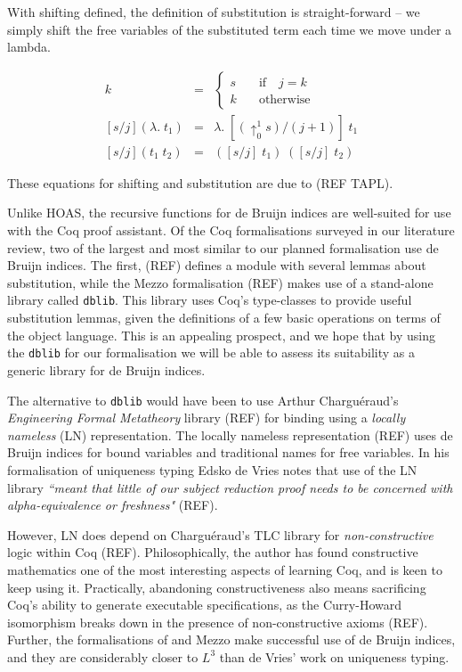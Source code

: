 \documentclass[]{unswthesis}
\newcommand{\SSPHS}{\text{SSPHS}}
\begin{document}
With shifting defined, the definition of substitution is straight-forward -- we simply shift the free variables of the substituted term each time we move under a lambda.

\begin{eqnarray*}
[s/j]k & = &
	\begin{cases}
	s \quad & \text{if} \quad j = k \\
	k \quad & \text{otherwise}
	\end{cases}\\
\left[s/j\right](\lambda. \; t_1) & = & \lambda. \; [(\uparrow^1_0 s)/(j + 1)] \; t_1\\
\left[s/j\right](t_1 \; t_2) & = & ([s/j] \; t_1) \; ([s/j] \; t_2)
\end{eqnarray*}

These equations for shifting and substitution are due to (REF TAPL).

Unlike HOAS, the recursive functions for de Bruijn indices are well-suited for use with the Coq proof assistant. Of the Coq formalisations surveyed in our literature review, two of the largest and most similar to our planned formalisation use de Bruijn indices. The first, \SSPHS (REF) defines a module with several lemmas about substitution, while the Mezzo formalisation (REF) makes use of a stand-alone library called \texttt{dblib}. This library uses Coq's type-classes to provide useful substitution lemmas, given the definitions of a few basic operations on terms of the object language. This is an appealing prospect, and we hope that by using the \texttt{dblib} for our formalisation we will be able to assess its suitability as a generic library for de Bruijn indices.

The alternative to \texttt{dblib} would have been to use Arthur Chargu\'{e}raud's \textit{Engineering Formal Metatheory} library (REF) for binding using a \textit{locally nameless} (LN) representation. The locally nameless representation (REF) uses de Bruijn indices for bound variables and traditional names for free variables. In his formalisation of uniqueness typing Edsko de Vries notes that use of the LN library \textit{``meant that little of our subject reduction proof needs to be concerned with alpha-equivalence or freshness"} (REF).

However, LN does depend on Chargu\'{e}raud's TLC library for \textit{non-constructive} logic within Coq (REF). Philosophically, the author has found constructive mathematics one of the most interesting aspects of learning Coq, and is keen to keep using it. Practically, abandoning constructiveness also means sacrificing Coq's ability to generate executable specifications, as the Curry-Howard isomorphism breaks down in the presence of non-constructive axioms (REF). Further, the formalisations of \SSPHS and Mezzo make successful use of de Bruijn indices, and they are considerably closer to $L^3$ than de Vries' work on uniqueness typing.
\end{document}
